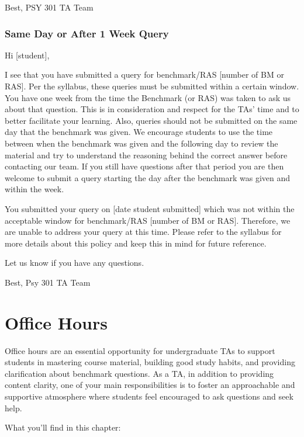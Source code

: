 \documentclass[
]{article}
\begin{document}
Best,
PSY 301 TA Team

\hypertarget{same-day-or-after-1-week-query}{%
\subsubsection{Same Day or After 1 Week Query}\label{same-day-or-after-1-week-query}}

Hi {[}student{]},

I see that you have submitted a query for benchmark/RAS {[}number of BM or RAS{]}. Per the syllabus, these queries must be submitted within a certain window. You have one week from the time the Benchmark (or RAS) was taken to ask us about that question. This is in consideration and respect for the TAs' time and to better facilitate your learning. Also, queries should not be submitted on the same day that the benchmark was given. We encourage students to use the time between when the benchmark was given and the following day to review the material and try to understand the reasoning behind the correct answer before contacting our team. If you still have questions after that period you are then welcome to submit a query starting the day after the benchmark was given and within the week.

You submitted your query on {[}date student submitted{]} which was not within the acceptable window for benchmark/RAS {[}number of BM or RAS{]}. Therefore, we are unable to address your query at this time. Please refer to the syllabus for more details about this policy and keep this in mind for future reference.

Let us know if you have any questions.

Best,
Psy 301 TA Team

\hypertarget{office-hours}{%
\section{Office Hours}\label{office-hours}}

Office hours are an essential opportunity for undergraduate TAs to support students in mastering course material, building good study habits, and providing clarification about benchmark questions. As a TA, in addition to providing content clarity, one of your main responsibilities is to foster an approachable and supportive atmosphere where students feel encouraged to ask questions and seek help.

What you'll find in this chapter:
\end{document}

